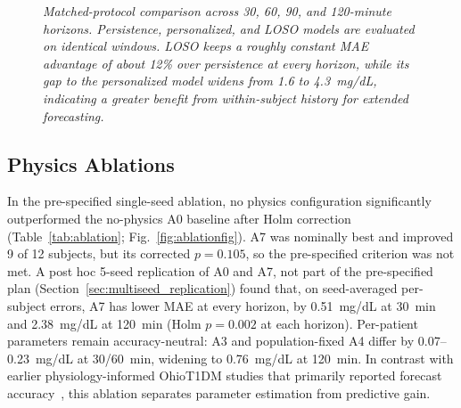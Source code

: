 \documentclass[journal]{IEEEtran}
\begin{document}
\begin{figure}[t]
\centering


\caption{\small\textit{Matched-protocol comparison across 30, 60, 90, and 120-minute horizons. Persistence, personalized, and LOSO models are evaluated on identical windows. LOSO keeps a roughly constant MAE advantage of about 12\% over persistence at every horizon, while its gap to the personalized model widens from 1.6 to 4.3~mg/dL, indicating a greater benefit from within-subject history for extended forecasting.}}
\label{fig:matched_protocol_comparison}
\end{figure}


\subsection{Physics Ablations}
In the pre-specified single-seed ablation, no physics configuration significantly outperformed the no-physics A0 baseline after Holm correction (Table~\ref{tab:ablation}; Fig.~\ref{fig:ablationfig}). A7 was nominally best and improved 9 of 12 subjects, but its corrected $p = 0.105$, so the pre-specified criterion was not met. A post hoc 5-seed replication of A0 and A7, not part of the pre-specified plan (Section~\ref{sec:multiseed_replication}) found that, on seed-averaged per-subject errors, A7 has lower MAE at every horizon, by 0.51~mg/dL at 30~min and 2.38~mg/dL at 120~min (Holm $p = 0.002$ at each horizon). Per-patient parameters remain accuracy-neutral: A3 and population-fixed A4 differ by 0.07--0.23~mg/dL at 30/60~min, widening to 0.76~mg/dL at 120~min. In contrast with earlier physiology-informed OhioT1DM studies that primarily reported forecast accuracy~\cite{ref58,ref59}, this ablation separates parameter estimation from predictive gain.
\end{document}
